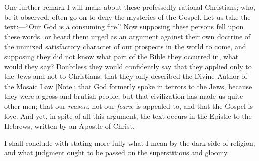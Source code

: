 One further remark I will make about these professedly
rational Christians; who, be it observed, often go on to
deny the mysteries of the Gospel. Let us take the
text:—``Our God is a consuming fire.'' Now
supposing these persons fell upon these words, or heard
them urged as an argument against their own doctrine of
the unmixed satisfactory character of our prospects in
the world to come, and supposing they did not know what
part of the Bible they occurred in, what would they say?
Doubtless they would confidently say that they applied
only to the Jews and not to Christians; that they only
described the Divine Author of the Mosaic Law [Note]; that God formerly spoke in terrors to the Jews,
because they were a gross and brutish people, but that
civilization has made us quite other men; that our \emph{reason},
not our \emph{fears}, is appealed to, and that the Gospel
is love. And yet, in spite of all this argument, the text
occurs in the Epistle to the Hebrews, written by an
Apostle of Christ.

I shall conclude with stating more fully what I mean
by the dark side of religion; and what judgment ought to
be passed on the superstitious and gloomy.

